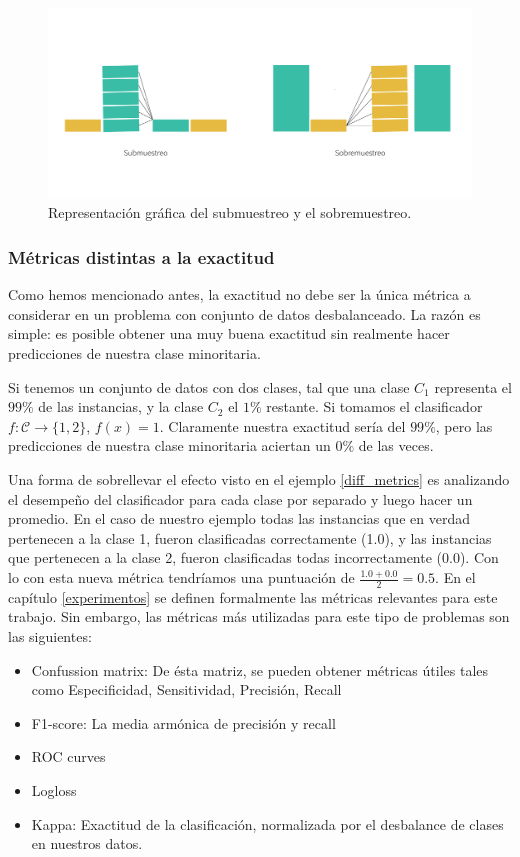     \begin{figure}[H]
        \centering
        \includegraphics[width=6in]{../cap1_preliminares/src/undersampling_oversampling.png}
        \caption{Representación gráfica del submuestreo y el sobremuestreo.}
    \end{figure}

    \subsubsection{Métricas distintas a la exactitud}
    Como hemos mencionado antes, la exactitud no debe ser la única métrica a considerar en un problema con conjunto de datos desbalanceado. La razón es simple: es posible obtener una muy buena exactitud sin realmente hacer predicciones de nuestra clase minoritaria.
    \begin{example}
        \label{diff_metrics}
        Si tenemos un conjunto de datos con dos clases, tal que una clase $C_1$ representa el $99\%$ de las instancias, y la clase $C_2$ el $1\%$ restante. Si tomamos el clasificador $f: \mathcal C \to \{1,2\}$, $f(x) = 1$. Claramente nuestra exactitud sería del $99\%$, pero las predicciones de nuestra clase minoritaria aciertan un $0\%$ de las veces.
    \end{example}{}
    Una forma de sobrellevar el efecto visto en el ejemplo \ref{diff_metrics} es analizando el desempeño del clasificador para cada clase por separado y luego hacer un promedio. En el caso de nuestro ejemplo todas las instancias que en verdad pertenecen a la clase 1, fueron clasificadas correctamente (1.0), y las instancias que pertenecen a la clase 2, fueron clasificadas todas incorrectamente (0.0). Con lo con esta nueva métrica tendríamos una puntuación de $\frac{1.0 + 0.0}{2} = 0.5$. En el capítulo \ref{experimentos} se definen formalmente las métricas relevantes para este trabajo. Sin embargo, las métricas más utilizadas para este tipo de problemas son las siguientes:
    \begin{itemize}
        \item Confussion matrix: De ésta matriz, se pueden obtener métricas útiles tales como Especificidad, Sensitividad, Precisión, Recall
        \item F1-score: La media armónica de precisión
         y recall
        \item ROC curves
        \item Logloss
        \item Kappa: Exactitud de la clasificación, normalizada por el desbalance de clases en nuestros datos.
    \end{itemize}
